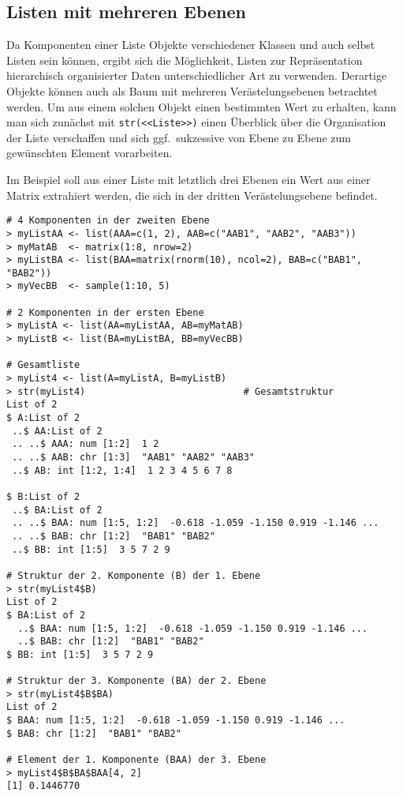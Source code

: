 \subsection{Listen mit mehreren Ebenen}
\label{sec:unlist}

Da Komponenten einer Liste Objekte verschiedener Klassen und auch selbst Listen sein können, ergibt sich die Möglichkeit, Listen zur Repräsentation hierarchisch organisierter Daten unterschiedlicher Art zu verwenden. Derartige Objekte können auch als Baum mit mehreren Verästelungsebenen betrachtet werden. Um aus einem solchen Objekt einen bestimmten Wert zu erhalten, kann man sich zunächst mit \lstinline!str(<<Liste>>)! einen Überblick über die Organisation der Liste verschaffen und sich ggf.\ sukzessive von Ebene zu Ebene zum gewünschten Element vorarbeiten.

Im Beispiel soll aus einer Liste mit letztlich drei Ebenen ein Wert aus einer Matrix extrahiert werden, die sich in der dritten Verästelungsebene befindet.
\begin{lstlisting}
# 4 Komponenten in der zweiten Ebene
> myListAA <- list(AAA=c(1, 2), AAB=c("AAB1", "AAB2", "AAB3"))
> myMatAB  <- matrix(1:8, nrow=2)
> myListBA <- list(BAA=matrix(rnorm(10), ncol=2), BAB=c("BAB1", "BAB2"))
> myVecBB  <- sample(1:10, 5)

# 2 Komponenten in der ersten Ebene
> myListA <- list(AA=myListAA, AB=myMatAB)
> myListB <- list(BA=myListBA, BB=myVecBB)

# Gesamtliste
> myList4 <- list(A=myListA, B=myListB)
> str(myList4)                            # Gesamtstruktur
List of 2
$ A:List of 2
 ..$ AA:List of 2
 .. ..$ AAA: num [1:2]  1 2
 .. ..$ AAB: chr [1:3]  "AAB1" "AAB2" "AAB3"
 ..$ AB: int [1:2, 1:4]  1 2 3 4 5 6 7 8

$ B:List of 2
 ..$ BA:List of 2
 .. ..$ BAA: num [1:5, 1:2]  -0.618 -1.059 -1.150 0.919 -1.146 ...
 .. ..$ BAB: chr [1:2]  "BAB1" "BAB2"
 ..$ BB: int [1:5]  3 5 7 2 9

# Struktur der 2. Komponente (B) der 1. Ebene
> str(myList4$B)
List of 2
$ BA:List of 2
  ..$ BAA: num [1:5, 1:2]  -0.618 -1.059 -1.150 0.919 -1.146 ...
  ..$ BAB: chr [1:2]  "BAB1" "BAB2"
$ BB: int [1:5]  3 5 7 2 9

# Struktur der 3. Komponente (BA) der 2. Ebene
> str(myList4$B$BA)
List of 2
$ BAA: num [1:5, 1:2]  -0.618 -1.059 -1.150 0.919 -1.146 ...
$ BAB: chr [1:2]  "BAB1" "BAB2"

# Element der 1. Komponente (BAA) der 3. Ebene
> myList4$B$BA$BAA[4, 2]
[1] 0.1446770
\end{lstlisting}

